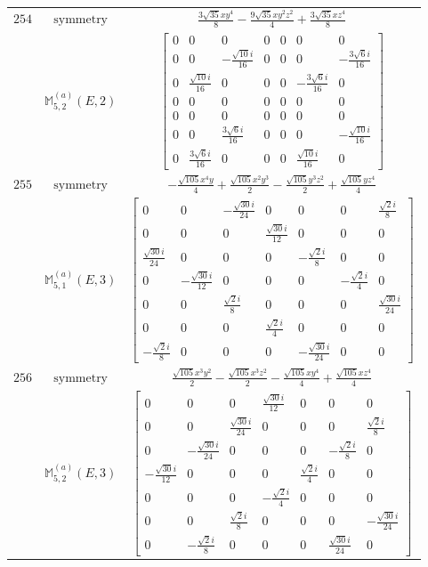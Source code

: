 \documentclass[fleqn,8pt,landscape]{jsarticle}
\begin{document}
\begin{longtable}{ccc}
$ 254 $ & $ \text{symmetry} $ & $ \frac{3 \sqrt{35} x y^{4}}{8} - \frac{9 \sqrt{35} x y^{2} z^{2}}{4} + \frac{3 \sqrt{35} x z^{4}}{8} $ \\
$  $ & $ \mathbb{M}_{5,2}^{(a)}(E,2) $ & $ \begin{bmatrix} 0 & 0 & 0 & 0 & 0 & 0 & 0 \\ 0 & 0 & - \frac{\sqrt{10} i}{16} & 0 & 0 & 0 & - \frac{3 \sqrt{6} i}{16} \\ 0 & \frac{\sqrt{10} i}{16} & 0 & 0 & 0 & - \frac{3 \sqrt{6} i}{16} & 0 \\ 0 & 0 & 0 & 0 & 0 & 0 & 0 \\ 0 & 0 & 0 & 0 & 0 & 0 & 0 \\ 0 & 0 & \frac{3 \sqrt{6} i}{16} & 0 & 0 & 0 & - \frac{\sqrt{10} i}{16} \\ 0 & \frac{3 \sqrt{6} i}{16} & 0 & 0 & 0 & \frac{\sqrt{10} i}{16} & 0 \end{bmatrix} $ \\ \hline
$ 255 $ & $ \text{symmetry} $ & $ - \frac{\sqrt{105} x^{4} y}{4} + \frac{\sqrt{105} x^{2} y^{3}}{2} - \frac{\sqrt{105} y^{3} z^{2}}{2} + \frac{\sqrt{105} y z^{4}}{4} $ \\
$  $ & $ \mathbb{M}_{5,1}^{(a)}(E,3) $ & $ \begin{bmatrix} 0 & 0 & - \frac{\sqrt{30} i}{24} & 0 & 0 & 0 & \frac{\sqrt{2} i}{8} \\ 0 & 0 & 0 & \frac{\sqrt{30} i}{12} & 0 & 0 & 0 \\ \frac{\sqrt{30} i}{24} & 0 & 0 & 0 & - \frac{\sqrt{2} i}{8} & 0 & 0 \\ 0 & - \frac{\sqrt{30} i}{12} & 0 & 0 & 0 & - \frac{\sqrt{2} i}{4} & 0 \\ 0 & 0 & \frac{\sqrt{2} i}{8} & 0 & 0 & 0 & \frac{\sqrt{30} i}{24} \\ 0 & 0 & 0 & \frac{\sqrt{2} i}{4} & 0 & 0 & 0 \\ - \frac{\sqrt{2} i}{8} & 0 & 0 & 0 & - \frac{\sqrt{30} i}{24} & 0 & 0 \end{bmatrix} $ \\ \hline
$ 256 $ & $ \text{symmetry} $ & $ \frac{\sqrt{105} x^{3} y^{2}}{2} - \frac{\sqrt{105} x^{3} z^{2}}{2} - \frac{\sqrt{105} x y^{4}}{4} + \frac{\sqrt{105} x z^{4}}{4} $ \\
$  $ & $ \mathbb{M}_{5,2}^{(a)}(E,3) $ & $ \begin{bmatrix} 0 & 0 & 0 & \frac{\sqrt{30} i}{12} & 0 & 0 & 0 \\ 0 & 0 & \frac{\sqrt{30} i}{24} & 0 & 0 & 0 & \frac{\sqrt{2} i}{8} \\ 0 & - \frac{\sqrt{30} i}{24} & 0 & 0 & 0 & - \frac{\sqrt{2} i}{8} & 0 \\ - \frac{\sqrt{30} i}{12} & 0 & 0 & 0 & \frac{\sqrt{2} i}{4} & 0 & 0 \\ 0 & 0 & 0 & - \frac{\sqrt{2} i}{4} & 0 & 0 & 0 \\ 0 & 0 & \frac{\sqrt{2} i}{8} & 0 & 0 & 0 & - \frac{\sqrt{30} i}{24} \\ 0 & - \frac{\sqrt{2} i}{8} & 0 & 0 & 0 & \frac{\sqrt{30} i}{24} & 0 \end{bmatrix} $ \\ \hline
\end{longtable}
\end{document}
